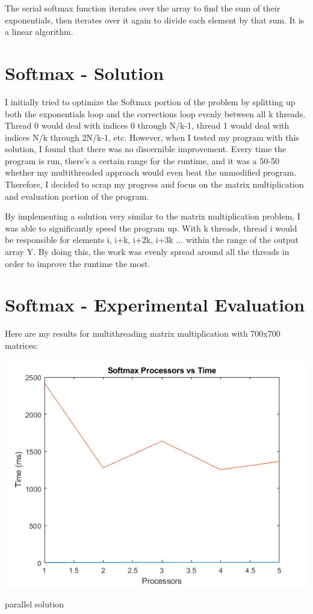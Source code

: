 \documentclass[a4paper]{article}
\begin{document}
The serial softmax function iterates over the array to find the sum of their exponentials, then iterates over it again to divide each element by that sum. It is a linear algorithm.


\section{Softmax - Solution}

I initially tried to optimize the Softmax portion of the problem by splitting up both the exponentials loop and the corrections loop evenly between all k threads. Thread 0 would deal with indices 0 through N/k-1, thread 1 would deal with indices N/k through 2N/k-1, etc. However, when I tested my program with this solution, I found that there was no discernible improvement. Every time the program is run, there's a certain range for the runtime, and it was a 50-50 whether my multithreaded approach would even beat the unmodified program. Therefore, I decided to scrap my progress and focus on the matrix multiplication and evaluation portion of the program.

By implementing a solution very similar to the matrix multiplication problem, I was able to significantly speed the program up. With k threads, thread i would be responsible for elements i, i+k, i+2k, i+3k ... within the range of the output array Y. By doing this, the work was evenly spread around all the threads in order to improve the runtime the most.

\section{Softmax - Experimental Evaluation}

Here are my results for multithreading matrix multiplication with 700x700 matrices:

\begin{center}
    \includegraphics[scale=1]{7a.png}
    \caption{parallel solution}
\end{center}
\end{document}
